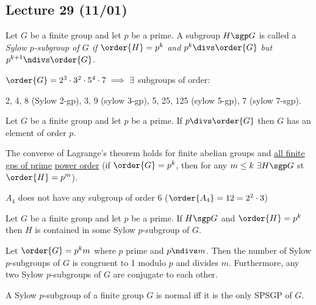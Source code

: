 \subsection*{Lecture 29 (11/01)} %
\begin{definition}
    Let \(G\) be a finite group and let \(p\) be a prime. A subgroup \(H\sgp G\) is called a \it{Sylow \(p\)-subgroup} of \(G\) if \(\order{H} = p^k\) and \(p^k\divs \order{G}\) but \(p^{k+1}\ndivs \order{G}\).
\end{definition}

\begin{example}
  \(\order{G}=2^3\cdot 3^2\cdot 5^4\cdot 7 \implies \exists\) subgroups of order:

  2, 4, 8 (Sylow 2-gp), 3, 9 (sylow 3-gp), 5, 25, 125 (sylow 5-gp), 7 (sylow 7-sgp).
\end{example}

\begin{corollary}
    Let \(G\) be a finite group and let \(p\) be a prime. If \(p\divs \order{G}\) then \(G\) has an element of order \(p\).
\end{corollary}

\begin{corollary}
  The converse of Lagrange's theorem holds for finite abelian groups and \uline{all finite gps of prime} \uline{power order} (if \(\order{G} = p^k\), then for any \(m\leq k\ \exists H \sgp G\) st \(\order{H}=p^m\)).
\end{corollary}

\begin{fact}
  \(A_4\) does not have any subgroup of order 6 (\(\order{A_4} = 12 = 2^2 \cdot 3\))
\end{fact}

\begin{theorem}
  Let \(G\) be a finite group and let \(p\) be a prime. If \(H\sgp G\) and \(\order{H}=p^k\) then \(H\) is contained in some Sylow \(p\)-subgroup of \(G\).
\end{theorem}

\begin{theorem}
  Let \(\order{G}=p^km\) where \(p\) prime and \(p\ndivs m\). Then the number of Sylow \(p\)-subgroups of \(G\) is congruent to 1 modulo \(p\) and divides \(m\). Furthermore, any two Sylow \(p\)-subgroups of \(G\) are conjugate to each other.
\end{theorem}

\begin{corollary}
  A Sylow \(p\)-subgroup of a finite group \(G\) is normal iff it is the only SPSGP of \(G\).
\end{corollary}

